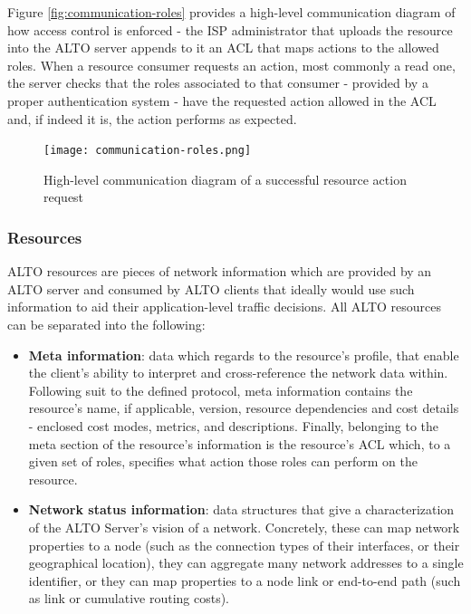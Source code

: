     Figure \ref{fig:communication-roles} provides a high-level communication diagram of how access control is enforced - the ISP administrator that uploads the resource into the ALTO server appends to it an ACL that maps actions to the allowed roles.
    When a resource consumer requests an action, most commonly a read one, the server checks that the roles associated to that consumer - provided by a proper authentication system - have the requested action allowed in the ACL and, if indeed it is, the action performs as expected.

\begin{figure}[h]
        \centering
        \texttt{[image: communication-roles.png]}
        \caption{High-level communication diagram of a successful resource action request}
        \label{fig:macro-architecture}
\end{figure}



\subsubsection{Resources}
\label{ssec:alto-resources}

    ALTO resources are pieces of network information which are provided by an ALTO server and consumed by ALTO clients that ideally would use such information to aid their application-level traffic decisions.
    All ALTO resources can be separated into the following:

\begin{itemize}
        \item \textbf{Meta information}: data which regards to the resource's profile, that enable the client's ability to interpret and cross-reference the network data within.
            Following suit to the defined protocol, meta information contains the resource's name, if applicable, version, resource dependencies and cost details - enclosed cost modes, metrics, and descriptions.
            Finally, belonging to the meta section of the resource's information is the resource's ACL which, to a given set of roles, specifies what action those roles can perform on the resource.

        \item \textbf{Network status information}: data structures that give a characterization of the ALTO Server's vision of a network. Concretely, these can map network properties to a node (such as the connection types of their interfaces, or their geographical location), they can aggregate many network addresses to a single identifier, or they can map properties to a node link or end-to-end path (such as link or cumulative routing costs).
\end{itemize}{}

